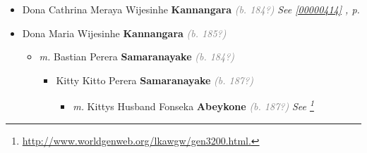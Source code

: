 \documentclass[10pt, openany]{book}
\begin{document}
\begin{itemize}
{\begin{itemize}
{\begin{itemize}
{\begin{itemize}
{\begin{itemize}
{\begin{itemize}
\item{Sandawathi \textbf{Kannangara} \textcolor{gray}{\textit{(b. 191?)}}
\begin{itemize}
\item{\textit{m.} Srimath Gopal \textbf{Kuruppu} \textcolor{gray}{\textit{(b. 191?)}}   \label{couple:00000453:00000510} \begin{itemize}
\item{Ratnaraja \textbf{Kuruppu} \textcolor{gray}{\textit{(b. 194?)}}
 }
\item{Kamal Regine \textbf{Kuruppu} \textcolor{gray}{\textit{(b. 194?)}}
  }
\end{itemize}}
\end{itemize}
 }
\end{itemize}}
\end{itemize}
  }
\item{Edwin Bartholemews Wijesinghe \textbf{Kannangara} \textcolor{gray}{\textit{(b. 188?)}}
   }
\item{Albert William Wijesinghe \textbf{Kannangara} \textcolor{gray}{\textit{(b. 188?)}}
   }
\item{Tiddy Brumpy Wijesinghe \textbf{Kannangara} \textcolor{gray}{\textit{(b. 188?)}}
   }
\end{itemize}}
\end{itemize}
   }
\item{Dona Cathrina Meraya Wijesinhe \textbf{Kannangara} \textcolor{gray}{\textit{(b. 184?)}} \textcolor{slteal}{\textit{See  \autoref{00000414} \textit{, p. \pageref{00000414} }}}}
\item{Dona Maria Wijesinhe \textbf{Kannangara} \textcolor{gray}{\textit{(b. 185?)}}
\begin{itemize}
\item{\textit{m.} Bastian Perera \textbf{Samaranayake} \textcolor{gray}{\textit{(b. 184?)}}   \label{couple:00000423:00000679} \begin{itemize}
\item{Kitty Kitto Perera \textbf{Samaranayake} \textcolor{gray}{\textit{(b. 187?)}}
\begin{itemize}
\item{\textit{m.} Kittys Husband Fonseka \textbf{Abeykone} \textcolor{gray}{\textit{(b. 187?)}} \textcolor{slmaroon}{\textit{See \footnote{\url{http://www.worldgenweb.org/lkawgw/gen3200.html.}}}}   \label{couple:00000005:00000682} \begin{itemize}

\end{itemize}}
\end{itemize}}
\end{itemize}}
\end{itemize}}
\end{itemize}}
\end{itemize}
\end{document}
